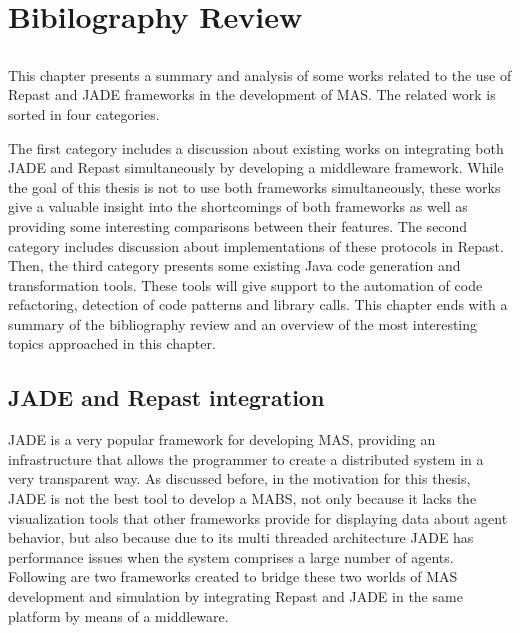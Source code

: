 \chapter{Bibilography Review} \label{chap:sota}

\section*{}



This chapter presents a summary and analysis of some works related to the use of Repast and JADE frameworks in the development of MAS. The related
work is sorted in four categories.

The first category includes a discussion about existing works on integrating both JADE and Repast simultaneously by developing a middleware framework.  While the goal of this thesis is not to use both frameworks simultaneously, these works give a valuable insight into the shortcomings of both frameworks as well as providing some interesting comparisons between their features. The second category includes discussion about implementations of these protocols in Repast. Then, the third category presents some existing Java code generation and transformation tools. These tools will give support to the automation of code refactoring, detection of code patterns and library calls. This chapter ends with a summary of the bibliography review and an overview of the most interesting topics approached in this chapter.

\section{JADE and Repast integration}
JADE is a very popular framework for developing MAS, providing an infrastructure that allows the programmer to create a distributed system in a very transparent way. As discussed before, in the motivation for this thesis, JADE is not the best tool to develop a MABS, not only because it lacks the visualization tools that other frameworks provide for displaying data about agent behavior, but also because due to its multi threaded architecture JADE has performance issues when the system comprises a large number of agents. Following are two frameworks created to bridge these two worlds of MAS development and simulation by integrating Repast and JADE in the same platform by means of a middleware.

